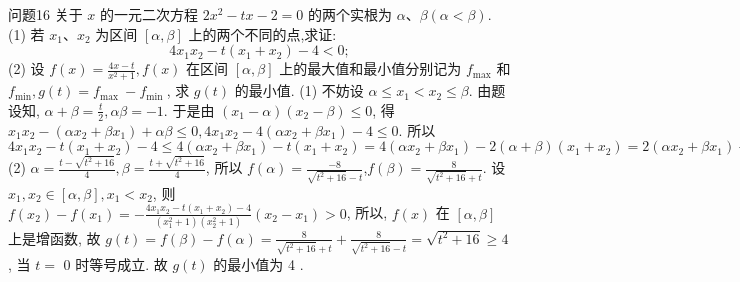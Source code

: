 问题16 关于 $x$ 的一元二次方程 $2 x^2-t x-2=0$ 的两个实根为 $\alpha 、 \beta(\alpha<\beta)$.
(1) 若 $x_1 、 x_2$ 为区间 $[\alpha, \beta]$ 上的两个不同的点,求证:
$$
4 x_1 x_2-t\left(x_1+x_2\right)-4<0 ;
$$
(2) 设 $f(x)=\frac{4 x-t}{x^2+1}, f(x)$ 在区间 $[\alpha, \beta]$ 上的最大值和最小值分别记为 $f_{\max }$ 和 $f_{\min }, g(t)=f_{\text {max }}-f_{\text {min }}$, 求 $g(t)$ 的最小值.
(1) 不妨设 $\alpha \leqslant x_1<x_2 \leqslant \beta$. 由题设知, $\alpha+\beta=\frac{t}{2}, \alpha \beta=-1$. 于是由 $\left(x_1-\alpha\right)\left(x_2-\beta\right) \leqslant 0$, 得 $x_1 x_2-\left(\alpha x_2+\beta x_1\right)+\alpha \beta \leqslant 0,4 x_1 x_2-4\left(\alpha x_2+\beta x_1\right)- 4 \leqslant 0$. 所以 $4 x_1 x_2-t\left(x_1+x_2\right)-4 \leqslant 4\left(\alpha x_2+\beta x_1\right)-t\left(x_1+x_2\right)=4\left(\alpha x_2+\beta\right. \left.x_1\right)-2(\alpha+\beta)\left(x_1+x_2\right)=2\left(\alpha x_2+\beta x_1\right)-2\left(\alpha x_1+\beta x_2\right)=2\left(x_2-x_1\right)(\alpha-\beta)<0.$  
(2) $\alpha=\frac{t-\sqrt{t^2+16}}{4}, \beta=\frac{t+\sqrt{t^2+16}}{4}$, 所以 $f(\alpha)=\frac{-8}{\sqrt{t^2+16}-t}$,$f(\beta)=\frac{8}{\sqrt{t^2+16}+t}$. 设 $x_1, x_2 \in[\alpha, \beta], x_1<x_2$, 则 $f\left(x_2\right)-f\left(x_1\right)= -\frac{4 x_1 x_2-t\left(x_1+x_2\right)-4}{\left(x_1^2+1\right)\left(x_2^2+1\right)}\left(x_2-x_1\right)>0$, 所以, $f(x)$ 在 $[\alpha, \beta]$ 上是增函数, 故 $g(t)=f(\beta)-f(\alpha)=\frac{8}{\sqrt{t^2+16}+t}+\frac{8}{\sqrt{t^2+16}-t}=\sqrt{t^2+16} \geqslant 4$, 当 $t=$ 0 时等号成立.
故 $g(t)$ 的最小值为 4 .


